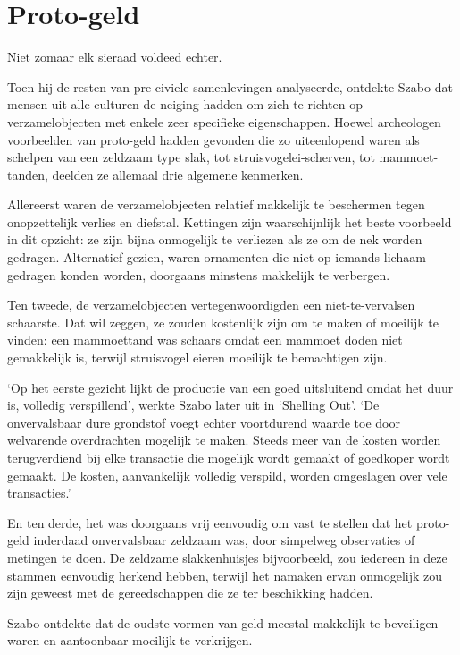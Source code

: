 \documentclass[
  a5paper,
  smalldemyvopaper,11pt,twoside,onecolumn,openright,extrafontsizes]{memoir}
\begin{document}
\section{Proto-geld}\label{proto-geld}

Niet zomaar elk sieraad voldeed echter.

Toen hij de resten van pre-civiele samenlevingen analyseerde, ontdekte
Szabo dat mensen uit alle culturen de neiging hadden om zich te richten
op verzamelobjecten met enkele zeer specifieke eigenschappen. Hoewel
archeologen voorbeelden van proto-geld hadden gevonden die zo
uiteenlopend waren als schelpen van een zeldzaam type slak, tot
struisvogelei-scherven, tot mammoet-tanden, deelden ze allemaal drie
algemene kenmerken.

Allereerst waren de verzamelobjecten relatief makkelijk te beschermen
tegen onopzettelijk verlies en diefstal. Kettingen zijn waarschijnlijk
het beste voorbeeld in dit opzicht: ze zijn bijna onmogelijk te
verliezen als ze om de nek worden gedragen. Alternatief gezien, waren
ornamenten die niet op iemands lichaam gedragen konden worden, doorgaans
minstens makkelijk te verbergen.

Ten tweede, de verzamelobjecten vertegenwoordigden een niet-te-vervalsen
schaarste. Dat wil zeggen, ze zouden kostenlijk zijn om te maken of
moeilijk te vinden: een mammoettand was schaars omdat een mammoet doden
niet gemakkelijk is, terwijl struisvogel eieren moeilijk te bemachtigen
zijn.

`Op het eerste gezicht lijkt de productie van een goed uitsluitend omdat
het duur is, volledig verspillend', werkte Szabo later uit in `Shelling
Out'. `De onvervalsbaar dure grondstof voegt echter voortdurend waarde
toe door welvarende overdrachten mogelijk te maken. Steeds meer van de
kosten worden terugverdiend bij elke transactie die mogelijk wordt
gemaakt of goedkoper wordt gemaakt. De kosten, aanvankelijk volledig
verspild, worden omgeslagen over vele transacties.'

En ten derde, het was doorgaans vrij eenvoudig om vast te stellen dat
het proto-geld inderdaad onvervalsbaar zeldzaam was, door simpelweg
observaties of metingen te doen. De zeldzame slakkenhuisjes
bijvoorbeeld, zou iedereen in deze stammen eenvoudig herkend hebben,
terwijl het namaken ervan onmogelijk zou zijn geweest met de
gereedschappen die ze ter beschikking hadden.

Szabo ontdekte dat de oudste vormen van geld meestal makkelijk te
beveiligen waren en aantoonbaar moeilijk te verkrijgen.
\end{document}
